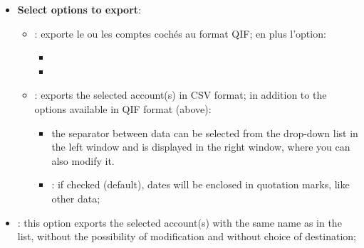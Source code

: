 \begin{enumerate}
\begin{itemize}
			\item \textbf{Select options to export}:%
				\begin{itemize}
					\item {}: exporte le ou les comptes cochés au format \gls{QIF}; en plus l'option:
						\begin{itemize}
							\item
							\item
						\end{itemize}
					\item {}: exports the selected account(s) in \gls{CSV} format; in addition to the options available in QIF format (above):
						\begin{itemize}
							\item the separator between data can be selected from the drop-down list in the left window and is displayed in the right window, where you can also modify it.
							\item {}: if checked (default), dates will be enclosed in quotation marks, like other data;
						\end{itemize}
				\end{itemize}
			\item {}: this option exports the selected account(s) with the same name as in the list, without the possibility of modification and without choice of destination;

\end{itemize}
\end{enumerate}
